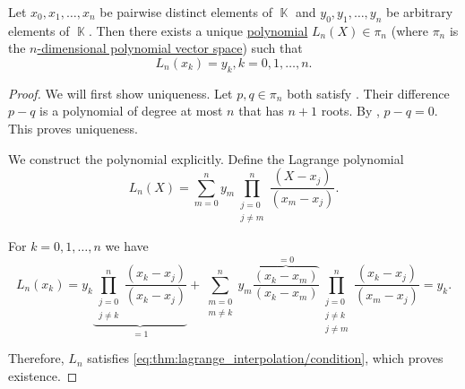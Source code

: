 \begin{theorem}\label{thm:lagrange_interpolation}
  Let \( x_0, x_1, \ldots, x_n \) be pairwise distinct elements of \( \BbbK \) and \( y_0, y_1, \ldots, y_n \) be arbitrary elements of \( \BbbK \). Then there exists a unique \hyperref[def:polynomial]{polynomial} \( L_n(X) \in \pi_n \) (where \( \pi_n \) is the \hyperref[def:polynomial_free_module]{\( n \)-dimensional polynomial vector space}) such that
  \begin{equation}\label{eq:thm:lagrange_interpolation/condition}
    L_n(x_k) = y_k, k = 0, 1, \ldots, n.
  \end{equation}
\end{theorem}
\begin{proof}
  We will first show uniqueness. Let \( p, q \in \pi_n \) both satisfy . Their difference \( p - q \) is a polynomial of degree at most \( n \) that has \( n + 1 \) roots. By , \( p - q = 0 \). This proves uniqueness.

  We construct the polynomial explicitly. Define the Lagrange polynomial
  \begin{equation*}
    L_n(X) = \sum_{m=0}^n y_m \prod_{\substack{j = 0 \\ j \neq m}}^n \frac {(X - x_j)} {(x_m - x_j)}.
  \end{equation*}

  For \( k = 0, 1, \ldots, n \) we have
  \begin{equation*}
    L_n(x_k) = y_k \underbrace{\prod_{\substack{j = 0 \\ j \neq k}}^n \frac {(x_k - x_j)} {(x_k - x_j)}}_{=1} + \sum_{\substack{m = 0 \\ m \neq k}}^n y_m \overbrace{\frac{(x_k - x_m)}{(x_k - x_m)}}^{=0} \prod_{\substack{j = 0 \\ j \neq k \\ j \neq m}}^n \frac {(x_k - x_j)} {(x_m - x_j)} = y_k.
  \end{equation*}

  Therefore, \( L_n \) satisfies \eqref{eq:thm:lagrange_interpolation/condition}, which proves existence.
\end{proof}
